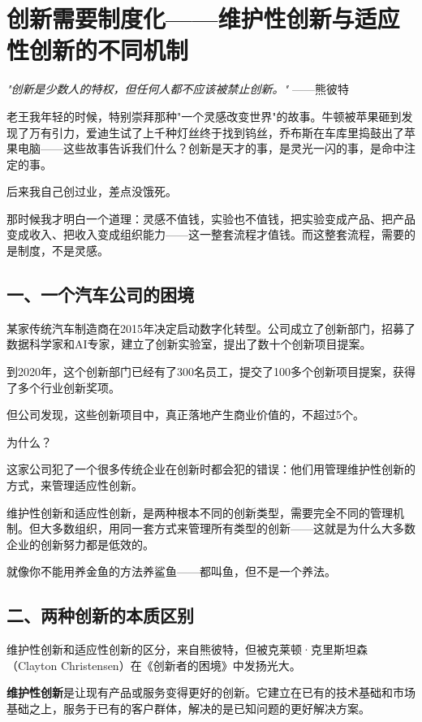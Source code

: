 \chapter{创新需要制度化——维护性创新与适应性创新的不同机制}


\textit{"创新是少数人的特权，但任何人都不应该被禁止创新。"}
——熊彼特


老王我年轻的时候，特别崇拜那种"一个灵感改变世界"的故事。牛顿被苹果砸到发现了万有引力，爱迪生试了上千种灯丝终于找到钨丝，乔布斯在车库里捣鼓出了苹果电脑——这些故事告诉我们什么？创新是天才的事，是灵光一闪的事，是命中注定的事。

后来我自己创过业，差点没饿死。

那时候我才明白一个道理：灵感不值钱，实验也不值钱，把实验变成产品、把产品变成收入、把收入变成组织能力——这一整套流程才值钱。而这整套流程，需要的是制度，不是灵感。

\section{一、一个汽车公司的困境}


某家传统汽车制造商在2015年决定启动数字化转型。公司成立了创新部门，招募了数据科学家和AI专家，建立了创新实验室，提出了数十个创新项目提案。

到2020年，这个创新部门已经有了300名员工，提交了100多个创新项目提案，获得了多个行业创新奖项。

但公司发现，这些创新项目中，真正落地产生商业价值的，不超过5个。

为什么？

这家公司犯了一个很多传统企业在创新时都会犯的错误：他们用管理维护性创新的方式，来管理适应性创新。

维护性创新和适应性创新，是两种根本不同的创新类型，需要完全不同的管理机制。但大多数组织，用同一套方式来管理所有类型的创新——这就是为什么大多数企业的创新努力都是低效的。

就像你不能用养金鱼的方法养鲨鱼——都叫鱼，但不是一个养法。

\section{二、两种创新的本质区别}


维护性创新和适应性创新的区分，来自熊彼特，但被克莱顿·克里斯坦森（Clayton Christensen）在《创新者的困境》中发扬光大。

\textbf{维护性创新}是让现有产品或服务变得更好的创新。它建立在已有的技术基础和市场基础之上，服务于已有的客户群体，解决的是已知问题的更好解决方案。

